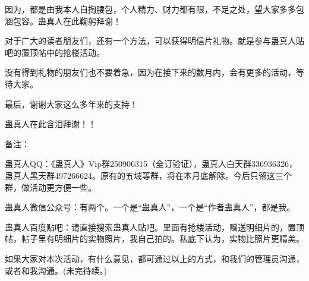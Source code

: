 \begin{this_body}
因为，都是由我本人自掏腰包，个人精力、财力都有限，不足之处，望大家多多包涵包容。蛊真人在此鞠躬拜谢！

对于广大的读者朋友们，还有一个方法，可以获得明信片礼物。就是参与蛊真人贴吧的置顶帖中的抢楼活动。

没有得到礼物的朋友们也不要着急，因为在接下来的数月内，会有更多的活动，等待大家。

最后，谢谢大家这么多年来的支持！

蛊真人在此含泪拜谢！！

备注：

蛊真人QQ：《蛊真人》Vip群250906315（全订验证），蛊真人白天群336936326，蛊真人黑天群497266624。原有的五域等群，将在本月底解除。今后只留这三个群，做活动更方便一些。

蛊真人微信公众号：有两个。一个是“蛊真人”，一个是“作者蛊真人”，都是我。

蛊真人百度贴吧：请直接搜索蛊真人贴吧。里面有抢楼活动，赠送明细片的，置顶帖，帖子里有明细片的实物照片，我自己拍的。私底下认为，实物比照片更精美。

如果大家对本次活动，有什么意见，都可通过以上的方式，和我们的管理员沟通，或者和我沟通。(未完待续。)

\end{this_body}

